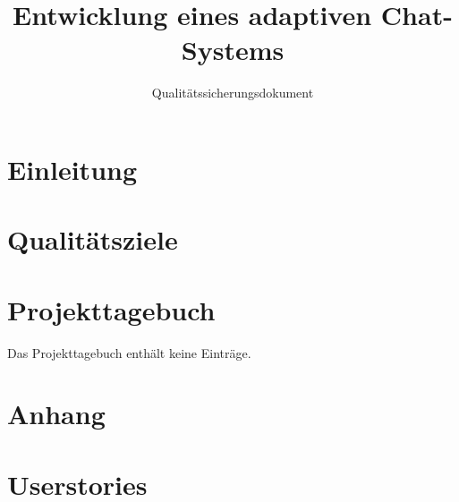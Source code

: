 \documentclass[accentcolor=tud0b,12pt,paper=a4]{tudreport}
\title{Entwicklung eines adaptiven Chat-Systems}
\subtitle{Qualitätssicherungsdokument}
\begin{document}
  \maketitle
  \tableofcontents

  \chapter{Einleitung}
  

  \chapter{Qualitätsziele}
  


  \chapter{Projekttagebuch}

  Das Projekttagebuch enthält keine Einträge.


\appendix
  \chapter{Anhang}
  

  \chapter{Userstories}
  
\end{document}
